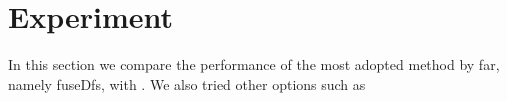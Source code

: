 \section{Experiment}
\label{sec:exp}

In this section we compare the performance of the most adopted method by far, namely
fuseDfs, with {\proj}. We also tried other options such as 
